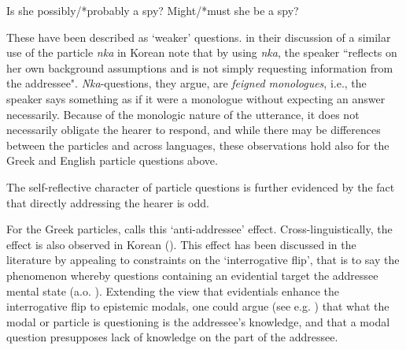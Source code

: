 \documentclass[output=paper,colorlinks,citecolor=brown]{langscibook}
\begin{document}
\ea Is she possibly/*probably a spy?
\ex Might/*must she be a spy?
\z

These have been described as `weaker' questions. \citet{kang2018, kang2019} in their discussion of a similar use of the particle \textit{nka} in Korean note that by using \textit{nka}, the speaker ``reflects on  her own background assumptions and is not simply requesting information from the addressee". \textit{Nka}-questions, they argue, are \textit{feigned monologues}, i.e., the speaker says something as if it were a monologue without expecting an answer necessarily. Because of the monologic nature of the utterance, it does not necessarily obligate the hearer to respond, and while there may be differences between the particles and across languages, these observations hold also for the Greek and English particle questions above. 

The self-reflective character of particle questions is further evidenced by the fact that directly addressing the hearer is odd. 	
 
 \z
 
 
    
 For the Greek particles, \citet{giannakidou2022} calls this `anti-addressee' effect. Cross-linguistically, the effect  is also observed in Korean (\citealt{kang2019}). This effect has been discussed in the literature by appealing to constraints on the  `interrogative flip', that is to say the phenomenon whereby questions containing an evidential target the addressee mental state (a.o. \citealt{bhadra2017}). Extending the view that evidentials enhance the interrogative flip to epistemic modals, one could argue (see e.g. \citealt{eckardt2019})  that what the modal or particle is questioning is the addressee's knowledge, and that a modal question presupposes lack of knowledge on the part of the addressee. 
 
\end{document}
